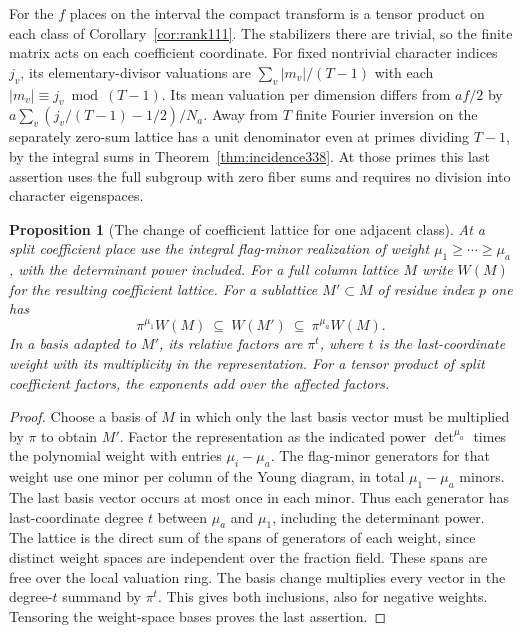 \documentclass[a4paper,11pt]{article}
\newtheorem{proposition}{Proposition}[section]
\theoremstyle{definition}
\theoremstyle{remark}
\numberwithin{equation}{section}
\begin{document}
For the \(f\) places on the interval the compact transform is a
tensor product on each class of Corollary~\ref{cor:rank111}.
The stabilizers there are trivial, so the finite matrix acts on each
coefficient coordinate. For fixed nontrivial character indices
\(j_v\), its elementary-divisor valuations are
\(\sum_v |m_v|/(T-1)\) with each \(|m_v|\equiv j_v\bmod(T-1)\).
Its mean valuation per dimension differs from \(af/2\) by
\(a\sum_v(j_v/(T-1)-1/2)/N_a\). Away from \(T\) finite Fourier
inversion on the separately zero-sum lattice has a unit denominator
even at primes dividing \(T-1\), by the integral sums in
Theorem~\ref{thm:incidence338}. At those primes this last assertion
uses the full subgroup with zero fiber sums and requires no division
into character eigenspaces.

\begin{proposition}[The change of coefficient lattice for one adjacent class]\label{prop:weightstep338}
At a split coefficient place use the integral flag-minor realization
of weight \(\mu_1\ge\cdots\ge\mu_a\), with the determinant power
included. For a full column lattice \(M\) write \(W(M)\) for the
resulting coefficient lattice. For a sublattice \(M'\subset M\)
of residue index \(p\) one has
\[
          \pi^{\mu_1}W(M)\ \subseteq\ W(M')                         \ \subseteq\ \pi^{\mu_a}W(M).
\]
In a basis adapted to \(M'\), its relative factors are
\(\pi^t\), where \(t\) is the last-coordinate weight with its
multiplicity in the representation. For a tensor product of split
coefficient factors, the exponents add over the affected factors.
\end{proposition}
\begin{proof}
Choose a basis of \(M\) in which only the last basis vector must
be multiplied by \(\pi\) to obtain \(M'\). Factor the representation
as the indicated power \(\det^{\mu_a}\) times the polynomial weight
with entries \(\mu_i-\mu_a\). The flag-minor generators for that
weight use one minor per column of the Young diagram, in total
\(\mu_1-\mu_a\) minors. The last basis vector occurs at most once
in each minor. Thus each generator has last-coordinate degree
\(t\) between \(\mu_a\) and \(\mu_1\), including the determinant
power. The lattice is the direct sum of the spans of generators of
each weight, since distinct weight spaces are independent over the
fraction field. These spans are free over the local valuation ring.
The basis change multiplies every vector in the degree-\(t\) summand
by \(\pi^t\). This gives both inclusions, also for negative weights.
Tensoring the weight-space bases proves the last assertion.
\end{proof}
\end{document}
